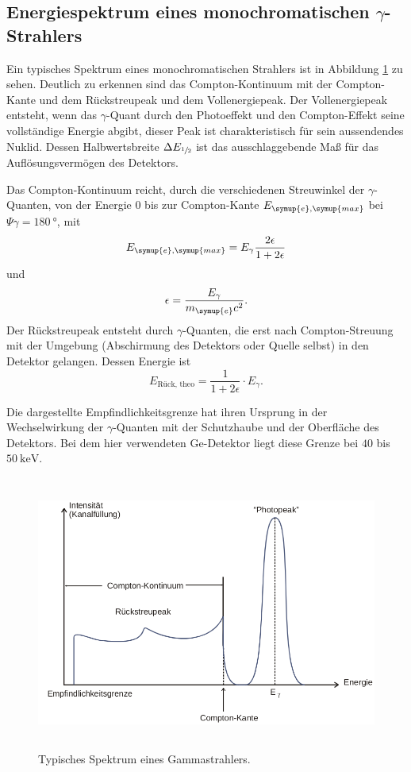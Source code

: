 \subsection{Energiespektrum eines monochromatischen \texorpdfstring{$\gamma$}{gamma}-Strahlers}
Ein typisches Spektrum eines monochromatischen Strahlers ist in Abbildung \ref{fig:Spektrum} zu sehen.
Deutlich zu erkennen sind das Compton-Kontinuum mit der Compton-Kante und dem Rückstreupeak und dem Vollenergiepeak.
Der Vollenergiepeak entsteht, wenn das $\gamma$-Quant durch den Photoeffekt und den Compton-Effekt seine vollständige Energie abgibt, dieser Peak ist charakteristisch für sein aussendendes Nuklid.
Dessen Halbwertsbreite $\Delta E_{\sfrac{1}{2}}$ ist das ausschlaggebende Maß für das Auflösungsvermögen des Detektors.

Das Compton-Kontinuum reicht, durch die verschiedenen Streuwinkel der $\gamma$-Quanten, von der Energie \num{0} bis zur Compton-Kante $E_{\symup{e},\symup{max}}$ bei $\Psi{\gamma}=\SI{180}{\degree}$, mit
\begin{equation}
\label{eqn:Com_Kante}
E_{\symup{e},\symup{max}}=E_{\gamma}\frac{2\epsilon}{1+2\epsilon}
\end{equation}
und
\begin{equation*}
\epsilon = \frac{E_{\gamma}}{m_{\symup{e}} c^2}.
\end{equation*}
Der Rückstreupeak entsteht durch $\gamma$-Quanten, die erst nach Compton-Streuung mit der Umgebung (Abschirmung des Detektors oder Quelle selbst) in den Detektor gelangen.
Dessen Energie ist
\begin{equation}
  \label{eqn:rueck}
  E_\text{Rück, theo} = \frac{1}{1+2\epsilon} \cdot E_{\gamma}.
\end{equation}

Die dargestellte Empfindlichkeitsgrenze hat ihren Ursprung in der Wechselwirkung der $\gamma$-Quanten mit der Schutzhaube und der Oberfläche des Detektors.
Bei dem hier verwendeten Ge-Detektor liegt diese Grenze bei $40$ bis $\SI{50}{\kilo\electronvolt}$.
 \begin{figure}
   \centering
   \includegraphics[height=9cm]{content/pictures/Spektrum.png}
   \caption{Typisches Spektrum eines Gammastrahlers.\cite{V18}}
   \label{fig:Spektrum}
 \end{figure}